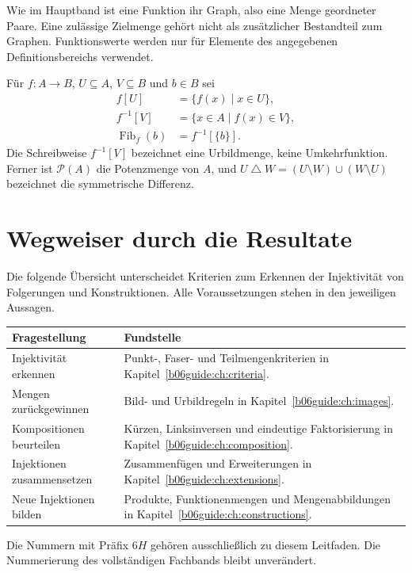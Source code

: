 Wie im Hauptband ist eine Funktion ihr Graph, also eine Menge
geordneter Paare. Eine zulässige Zielmenge gehört nicht als
zusätzlicher Bestandteil zum Graphen. Funktionswerte werden nur
für Elemente des angegebenen Definitionsbereichs verwendet.

\begin{definition}
Für $f\colon A\to B$, $U\subseteq A$, $V\subseteq B$ und $b\in B$ sei
\[
 \begin{aligned}
 f[U]&=\{f(x)\mid x\in U\},\\
 f^{-1}[V]&=\{x\in A\mid f(x)\in V\},\\
 \operatorname{Fib}_f(b)&=f^{-1}[\{b\}].
 \end{aligned}
\]
Die Schreibweise $f^{-1}[V]$ bezeichnet eine Urbildmenge,
keine Umkehrfunktion. Ferner ist $\mathcal P(A)$ die Potenzmenge
von $A$, und
$U\mathbin{\triangle}W=(U\setminus W)\cup(W\setminus U)$
bezeichnet die symmetrische Differenz.
\end{definition}

\section{Wegweiser durch die Resultate}

Die folgende Übersicht unterscheidet Kriterien zum Erkennen
der Injektivität von Folgerungen und Konstruktionen.
Alle Voraussetzungen stehen in den jeweiligen Aussagen.

\begin{center}
\begin{tabularx}{\textwidth}{@{}p{}X@{}}
\toprule
Fragestellung & Fundstelle\\
\midrule
Injektivität erkennen &
Punkt-, Faser- und Teilmengenkriterien in
Kapitel~\ref{b06guide:ch:criteria}.\\
Mengen zurückgewinnen &
Bild- und Urbildregeln in Kapitel~\ref{b06guide:ch:images}.\\
Kompositionen beurteilen &
Kürzen, Linksinversen und eindeutige Faktorisierung in
Kapitel~\ref{b06guide:ch:composition}.\\
Injektionen zusammensetzen &
Zusammenfügen und Erweiterungen in
Kapitel~\ref{b06guide:ch:extensions}.\\
Neue Injektionen bilden &
Produkte, Funktionenmengen und Mengenabbildungen in
Kapitel~\ref{b06guide:ch:constructions}.\\
\bottomrule
\end{tabularx}
\end{center}

Die Nummern mit Präfix $6H$ gehören ausschließlich zu diesem
Leitfaden. Die Nummerierung des vollständigen Fachbands bleibt
unverändert.